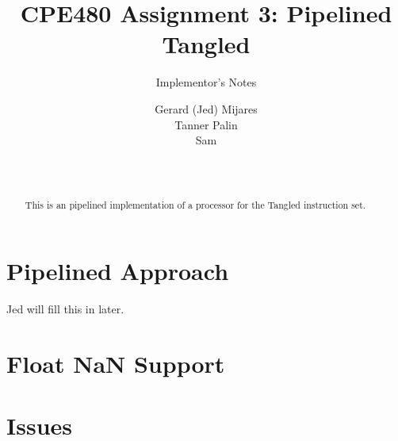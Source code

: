 \documentclass{sig-alternate-05-2015}
\begin{document}

\title{CPE480 Assignment 3: Pipelined Tangled }
\subtitle{Implementor's Notes}

\author{
Gerard (Jed) Mijares\\
Tanner Palin\\
Sam\\
       \\
       \\
}

\maketitle
\begin{abstract}
This is an pipelined implementation of a processor for the Tangled instruction set. 
\end{abstract}

\section{Pipelined Approach}

Jed will fill this in later.


\section{Float NaN Support}

\section{Issues}
\end{document}
